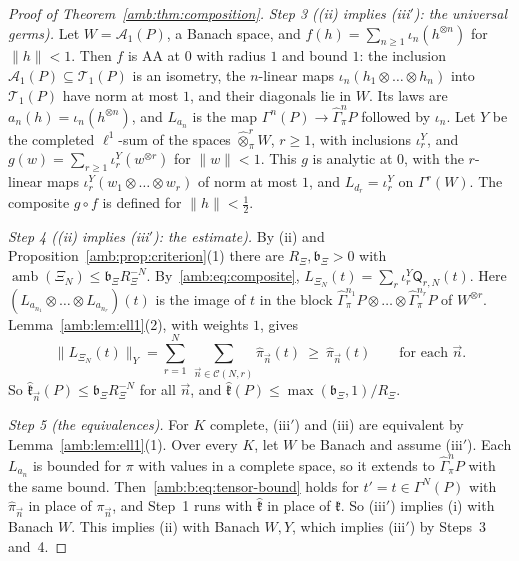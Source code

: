 \documentclass[11pt]{amsart}
\theoremstyle{definition}
\theoremstyle{remark}
\numberwithin{equation}{section}
\newcommand{\norm}[1]{\lVert #1\rVert}
\theoremstyle{plain}
\theoremstyle{definition}
\theoremstyle{plain}
\newcommand{\hGamma}{\widehat\Gamma}
\begin{document}
\begin{proof}[Proof of Theorem~\ref{amb:thm:composition}]
\emph{Step 3 ((ii) implies (iii$'$): the universal germs).} Let $W=\mathcal A_1(P)$, a Banach space, and $f(h)=\sum_{n\ge1}\iota_n(h^{\otimes n})$ for $\norm h<1$. Then $f$ is AA at $0$ with radius $1$ and bound $1$: the inclusion $\mathcal A_1(P)\subseteq\mathcal T_1(P)$ is an isometry, the $n$-linear maps $\iota_n(h_1\otimes\dots\otimes h_n)$ into $\mathcal T_1(P)$ have norm at most $1$, and their diagonals lie in $W$. Its laws are $a_n(h)=\iota_n(h^{\otimes n})$, and $L_{a_n}$ is the map $\Gamma^n(P)\to\hGamma^n_\pi P$ followed by $\iota_n$. Let $Y$ be the completed $\ell^1$-sum of the spaces $\widehat\otimes^r_\pi W$, $r\ge1$, with inclusions $\iota^Y_r$, and $g(w)=\sum_{r\ge1}\iota^Y_r(w^{\otimes r})$ for $\norm w<1$. This $g$ is analytic at $0$, with the $r$-linear maps $\iota^Y_r(w_1\otimes\dots\otimes w_r)$ of norm at most $1$, and $L_{d_r}=\iota^Y_r$ on $\Gamma^r(W)$. The composite $g\circ f$ is defined for $\norm h<\frac12$.

\emph{Step 4 ((ii) implies (iii$'$): the estimate).} By (ii) and Proposition~\ref{amb:prop:criterion}(1) there are $R_\Xi,\mathfrak b_\Xi>0$ with $\operatorname{amb}(\Xi_N)\le \mathfrak b_\Xi R_\Xi^{-N}$. By~\eqref{amb:eq:composite}, $L_{\Xi_N}(t)=\sum_r\iota^Y_r\mathsf Q_{r,N}(t)$. Here $(L_{a_{n_1}}\otimes\dots\otimes L_{a_{n_r}})(t)$ is the image of $t$ in the block $\hGamma^{n_1}_\pi P\otimes\dots\otimes\hGamma^{n_r}_\pi P$ of $W^{\otimes r}$. Lemma~\ref{amb:lem:ell1}(2), with weights $1$, gives
\[
 \norm{L_{\Xi_N}(t)}_Y=\sum_{r=1}^N\ \sum_{\vec n\in\mathcal C(N,r)}\widehat\pi_{\vec n}(t)\ \ge\ \widehat\pi_{\vec n}(t)\qquad\text{for each }\vec n.
\]
So $\widehat{\mathfrak k}_{\vec n}(P)\le \mathfrak b_\Xi R_\Xi^{-N}$ for all $\vec n$, and $\widehat{\mathfrak k}(P)\le\max(\mathfrak b_\Xi,1)/R_\Xi$.

\emph{Step 5 (the equivalences).} For $K$ complete, (iii$'$) and (iii) are equivalent by Lemma~\ref{amb:lem:ell1}(1). Over every $K$, let $W$ be Banach and assume (iii$'$). Each $L_{a_n}$ is bounded for $\pi$ with values in a complete space, so it extends to $\hGamma^n_\pi P$ with the same bound. Then~\eqref{amb:b:eq:tensor-bound} holds for $t'=t\in\Gamma^N(P)$ with $\widehat\pi_{\vec n}$ in place of $\pi_{\vec n}$, and Step~1 runs with $\widehat{\mathfrak k}$ in place of $\mathfrak k$. So (iii$'$) implies (i) with Banach $W$. This implies (ii) with Banach $W,Y$, which implies (iii$'$) by Steps~3 and~4.


\end{proof}
\end{document}
